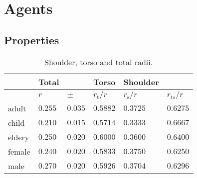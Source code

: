 \section{Agents}
\subsection{Properties}

\begin{table}[H]
\begin{tabularx}{1.0\linewidth}{ l l l l l l}
& Total && Torso & Shoulder & \\
\hline
& $ r $ & $ \pm $ & $ r_{\text{t}} / r $ & $ r_{\text{s}} / r $ & $ r_{ts} / r $ \\
\hline\hline
adult & $ 0.255 $ & $ 0.035 $ & $ 0.5882 $ & $ 0.3725 $ & $ 0.6275 $ \\
child & $ 0.210 $ & $ 0.015 $ & $ 0.5714 $ & $ 0.3333 $ & $ 0.6667 $ \\
eldery & $ 0.250 $ & $ 0.020 $ & $ 0.6000 $ & $ 0.3600 $ & $ 0.6400 $ \\
female & $ 0.240 $ & $ 0.020 $ & $ 0.5833 $ & $ 0.3750 $ & $ 0.6250 $ \\
male & $ 0.270 $ & $ 0.020 $ & $ 0.5926 $ & $ 0.3704 $ & $ 0.6296 $ \\
\hline
\end{tabularx} 
\caption{Shoulder, torso and total radii.}
\end{table}


